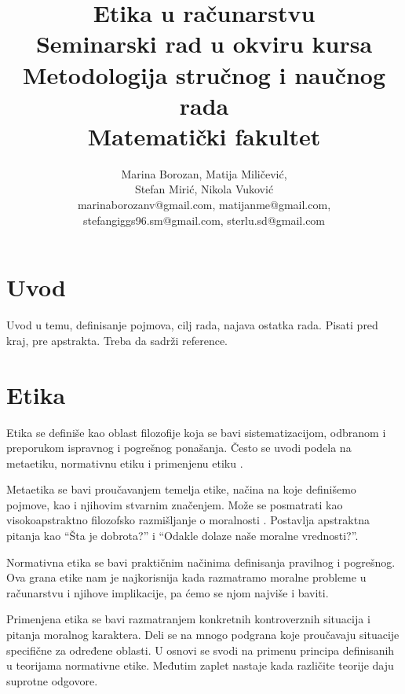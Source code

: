 \documentclass[a4paper]{article}
\begin{document}
\title{Etika u računarstvu\\ \small{Seminarski rad u okviru kursa\\Metodologija stručnog i naučnog rada\\ Matematički fakultet}}

\author{
	Marina Borozan, Matija Miličević,\\
	Stefan Mirić, Nikola Vuković\\
	marinaborozanv@gmail.com, matijanme@gmail.com,\\
	stefangiggs96.sm@gmail.com, sterlu.sd@gmail.com
}


\maketitle


\tableofcontents

\newpage

\section{Uvod}

Uvod u temu, definisanje pojmova, cilj rada, najava ostatka rada.
Pisati pred kraj, pre apstrakta. Treba da sadrži reference.

\section{Etika}
Etika se definiše kao oblast filozofije koja se bavi sistematizacijom, odbranom i preporukom ispravnog i pogrešnog ponašanja. Često se uvodi podela na metaetiku, normativnu etiku i primenjenu etiku \cite{ethics-iep}. 

Metaetika se bavi proučavanjem temelja etike, načina na koje definišemo pojmove, kao i njihovim stvarnim značenjem. Može se posmatrati kao visokoapstraktno filozofsko razmišljanje o moralnosti \cite{metaethics-iep}. Postavlja apstraktna pitanja kao ``Šta je dobrota?'' i ``Odakle dolaze naše moralne vrednosti?''.

Normativna etika se bavi praktičnim načinima definisanja pravilnog i pogrešnog. Ova grana etike nam je najkorisnija kada razmatramo moralne probleme u računarstvu i njihove implikacije, pa ćemo se njom najviše i baviti. 

Primenjena etika se bavi razmatranjem konkretnih kontroverznih situacija i pitanja moralnog karaktera. Deli se na mnogo podgrana koje proučavaju situacije specifične za određene oblasti. U osnovi se svodi na primenu principa definisanih u teorijama normativne etike. Međutim zaplet nastaje kada različite teorije daju suprotne odgovore. 
\end{document}
